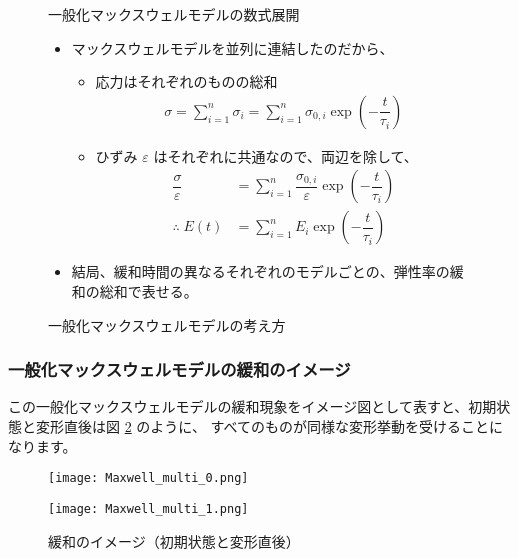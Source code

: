 \documentclass[uplatex,dvipdfmx,a4paper,11pt]{jsreport}
\begin{document}
\begin{figure}[htb]
	\begin{center}
		\begin{minipage}{0.9\textwidth}
			\begin{itembox}[l]{一般化マックスウェルモデルの数式展開}
				\begin{itemize}
					\item マックスウェルモデルを並列に連結したのだから、
					\begin{itemize}
						\item 応力はそれぞれのものの総和
						\begin{align*}
							\sigma = \sum_{i=1}^n \sigma_i
								= \sum_{i=1}^n \sigma_{0,i}\exp\left(-\dfrac{t}{\tau_i} \right)
						\end{align*}
						\item ひずみ $\varepsilon$ はそれぞれに共通なので、両辺を除して、
						\begin{align*}
							\dfrac{\sigma}{\varepsilon} &= \sum_{i=1}^n \dfrac{\sigma_{0,i}}{\varepsilon}\exp\left(-\dfrac{t}{\tau_i} \right) \\
							\therefore \; E(t) &= \sum_{i=1}^n E_i \exp\left(-\dfrac{t}{\tau_i} \right)
						\end{align*}
					\end{itemize}
					\item 結局、緩和時間の異なるそれぞれのモデルごとの、弾性率の緩和の総和で表せる。
				\end{itemize}
			\end{itembox}
		\end{minipage}
		\caption{一般化マックスウェルモデルの考え方}
		\label{fig:kanngae_gen_max}
	\end{center}
\end{figure}

\subsubsection{一般化マックスウェルモデルの緩和のイメージ}
この一般化マックスウェルモデルの緩和現象をイメージ図として表すと、初期状態と変形直後は図 \ref{fig:img_gen_max_0} のように、
すべてのものが同様な変形挙動を受けることになります。

\begin{figure}[htb]
	\begin{center}
		\begin{minipage}{0.45\textwidth}
			\begin{center}
				\texttt{[image: Maxwell\_multi\_0.png]}
			\end{center}
		\end{minipage}
		\begin{minipage}{0.45\textwidth}
			\begin{center}
				\texttt{[image: Maxwell\_multi\_1.png]}
			\end{center}
		\end{minipage}
		\caption{緩和のイメージ（初期状態と変形直後）}
		\label{fig:img_gen_max_0}
	\end{center}
\end{figure}
\end{document}
